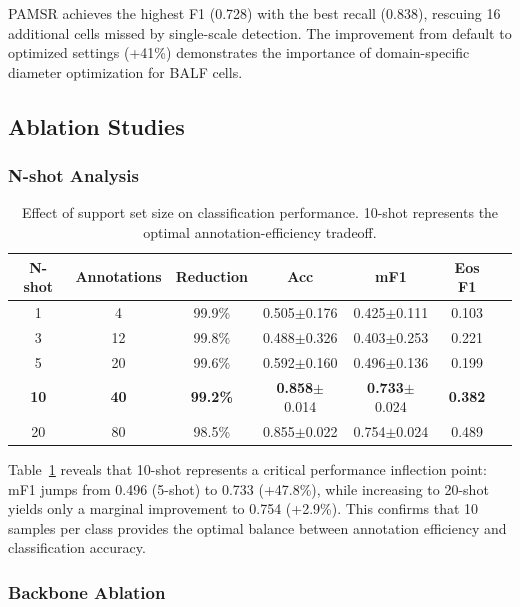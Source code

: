 \documentclass[preprint,review,12pt]{elsarticle}
\begin{document}
PAMSR achieves the highest F1 (0.728) with the best recall (0.838), rescuing 16 additional cells missed by single-scale detection. The improvement from default to optimized settings (+41\%) demonstrates the importance of domain-specific diameter optimization for BALF cells.

\subsection{Ablation Studies}

\subsubsection{N-shot Analysis}

\begin{table}[htbp]
\centering
\caption{Effect of support set size on classification performance. 10-shot represents the optimal annotation-efficiency tradeoff.}
\label{tab:nshot}
\begin{tabular}{ccccccc}
\toprule
\textbf{N-shot} & \textbf{Annotations} & \textbf{Reduction} & \textbf{Acc} & \textbf{mF1} & \textbf{Eos F1} \\
\midrule
1 & 4 & 99.9\% & 0.505$\pm$0.176 & 0.425$\pm$0.111 & 0.103 \\
3 & 12 & 99.8\% & 0.488$\pm$0.326 & 0.403$\pm$0.253 & 0.221 \\
5 & 20 & 99.6\% & 0.592$\pm$0.160 & 0.496$\pm$0.136 & 0.199 \\
\textbf{10} & \textbf{40} & \textbf{99.2\%} & \textbf{0.858}$\pm$0.014 & \textbf{0.733}$\pm$0.024 & \textbf{0.382} \\
20 & 80 & 98.5\% & 0.855$\pm$0.022 & 0.754$\pm$0.024 & 0.489 \\
\bottomrule
\end{tabular}
\end{table}

Table~\ref{tab:nshot} reveals that 10-shot represents a critical performance inflection point: mF1 jumps from 0.496 (5-shot) to 0.733 (+47.8\%), while increasing to 20-shot yields only a marginal improvement to 0.754 (+2.9\%). This confirms that 10 samples per class provides the optimal balance between annotation efficiency and classification accuracy.

\subsubsection{Backbone Ablation}
\end{document}
